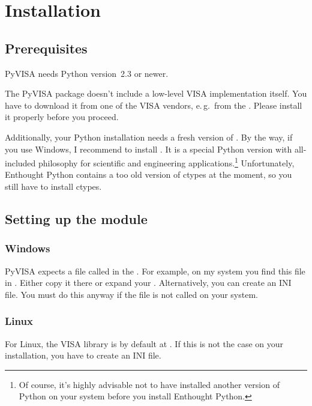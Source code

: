 \documentclass{howto}
\begin{document}
\section{Installation}

\subsection{Prerequisites}

PyVISA needs Python version~2.3 or newer.

The PyVISA package doesn't include a low-level VISA implementation itself.  You
have to download it from one of the VISA vendors, e.\,g.\ from the
.  Please install
it properly before you proceed.

Additionally, your Python installation needs a fresh version of
.  By the way,
if you use Windows, I recommend to install .  It is a special Python version
with all-included philosophy for scientific and engineering
applications.\footnote{Of course, it's highly advisable not to have installed
  another version of Python on your system before you install Enthought
  Python.}  Unfortunately, Enthought Python contains a too old version of
ctypes at the moment, so you still have to install ctypes.


\subsection{Setting up the module}

\subsubsection{Windows}

PyVISA expects a file called  in the \@.  For
example, on my system you find this file in .
Either copy it there or expand your .  Alternatively, you can
create an INI file.  You must do this anyway if the file is not called
 on your system.


\subsubsection{Linux}

For Linux, the VISA library is by default at
.  If this is not the case on
your installation, you have to create an INI file.
\end{document}
